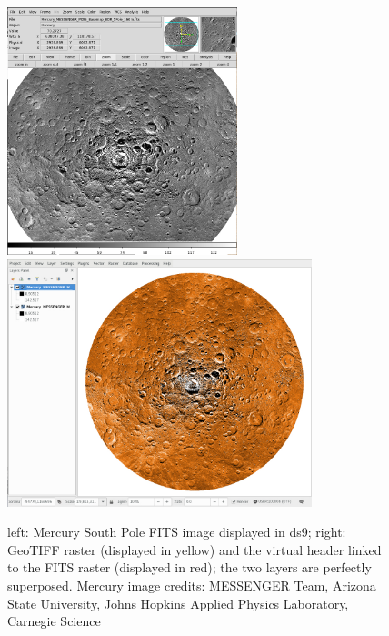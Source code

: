 \begin{figure}[ht!]
\centerline{\includegraphics[height=17pc]{ess_marmo2} \includegraphics[height=17pc]{ess_marmo1}}
\caption{left: Mercury South Pole FITS image displayed in ds9;
right: GeoTIFF raster (displayed in yellow) and the virtual
header linked to the FITS raster (displayed in red); the two layers
are perfectly superposed.
Mercury image credits: MESSENGER Team, Arizona State University, Johns Hopkins Applied
Physics Laboratory, Carnegie Science}
\label{fig:ds9qgis}
\end{figure}

